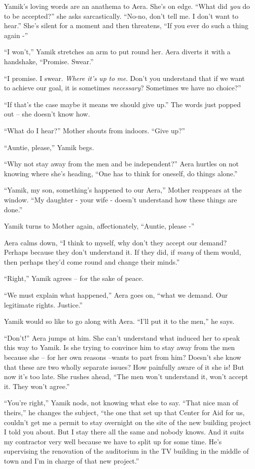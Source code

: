 \documentclass[twoside,11pt]{book}
\begin{document}
Yamik's loving words are an anathema to Aera. She's on edge. ``What did \textit{you} do to be
accepted?'' she asks sarcastically. ``No-no, don't tell me. I don't want to
hear.'' She's silent for a moment and then threatens, ``If you ever do such a thing again
-''

``I won't,'' Yamik stretches an arm to put round her. Aera diverts it with a handshake,
``Promise. Swear.''

``I promise. I swear. \textit{Where it's up to me}. Don't you understand that if we want to achieve our
goal, it is sometimes \textit{necessary}? Sometimes we have no choice?''

``If that's the case maybe it means we should give up.'' The words just popped out -- she
doesn't know how.

``What do I hear?'' Mother shouts from indoors. ``Give up?''

``Auntie, please,'' Yamik begs.

``Why not stay away from the men and be independent?'' Aera hurtles on not knowing where she's heading,
``One has to think for oneself, do things alone.''

``Yamik, my son, something's happened to our Aera,'' Mother reappears at the window.
``My daughter - your wife - doesn't understand how these things are done.''

Yamik turns to Mother again, affectionately, ``Auntie, please -''

Aera calms down, ``I think to myself, why don't they accept our demand? Perhaps because they don't
understand it. If they did, if \textit{many} of them would, then perhaps they'd come round and change their
minds.''

``Right,'' Yamik agrees -- for the sake of peace.

``We must explain what happened,'' Aera goes on, ``what we demand. Our legitimate rights.
Justice.''

Yamik would so like to go along with Aera. ``I'll put it to the men,'' he says.

``Don't!'' Aera jumps at him. She can't understand what induced her to speak this way to
Yamik. Is she trying to convince him to stay away from the men because she -- for her own reasons --wants to part from
him? Doesn't she know that these are two wholly separate issues? How painfully aware of it she is! But now it's too
late. She rushes ahead, ``The men won't understand it, won't accept it.  They won't agree.''

``You're right,'' Yamik nods, not knowing what else to say. ``That nice man of
theirs,'' he changes the subject, ``the one that set up that Center for Aid for us, couldn't get me a permit to stay
overnight on the site of the new building project I told you about. But I stay there all the same and nobody knows. And
it suits my contractor very well because we have to split up for some time. He's supervising the renovation of the
auditorium in the TV building in the middle of town and I'm in charge of that new project.''
\end{document}
